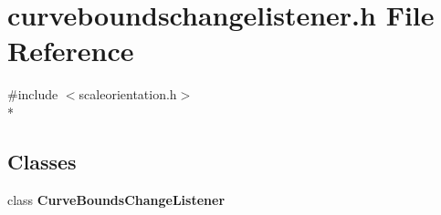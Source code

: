\section{curveboundschangelistener.\+h File Reference}
\label{curveboundschangelistener_8h}
{\ttfamily \#include $<$scaleorientation.\+h$>$}\\*
\subsection*{Classes}
\begin{DoxyCompactItemize}
\item 
class {\bf Curve\+Bounds\+Change\+Listener}
\end{DoxyCompactItemize}
